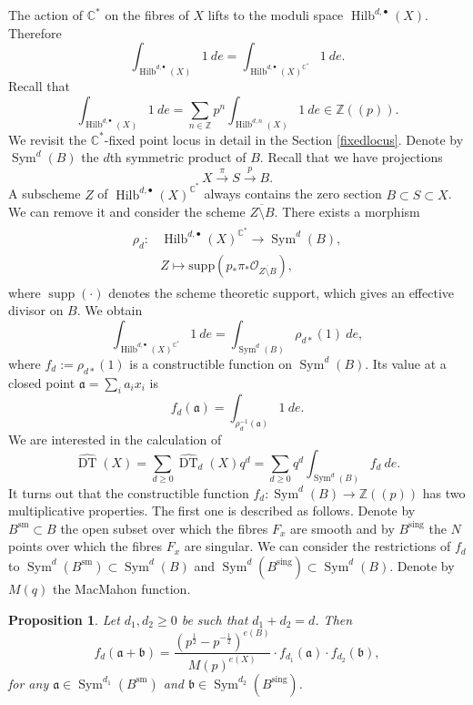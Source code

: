 \documentclass{amsart}
\newtheorem{proposition}[theorem]{Proposition}
\theoremstyle{definition}
\newcommand{\CC} {\mathbb{C}}          %
\newcommand{\ZZ} {\mathbb{Z}}		%
\renewcommand{\O}{\mathcal{O}}
\newcommand{\Sym}{\operatorname{Sym}}
\newcommand{\Hilb}{\operatorname{Hilb}}
\newcommand{\DT}{\operatorname{DT}}
\newcommand{\supp}{\operatorname{supp}}
\newcommand{\sm}{\operatorname{sm}}
\newcommand{\sing}{\operatorname{sing}}
\begin{document}
The action of $\CC^*$ on the fibres of $X$ lifts to the moduli space $\Hilb^{d,\bullet}(X)$. Therefore
$$
\int_{\Hilb^{d,\bullet}(X)} 1 \ de = \int_{\Hilb^{d,\bullet}(X)^{\CC^*}} 1 \ de.
$$
Recall that 
$$
\int_{\Hilb^{d,\bullet}(X)} 1 \ de = \sum_{n \in \ZZ} p^n \int_{\Hilb^{d,n}(X)} 1 \ de \in \ZZ(\!(p)\!).
$$
We revisit the $\CC^*$-fixed point locus in detail in the Section \ref{fixedlocus}. Denote by $\Sym^d(B)$ the $d$th symmetric product of $B$. Recall that we have projections 
$$
X \stackrel{\pi}{\longrightarrow} S \stackrel{p}{\longrightarrow} B.
$$
A subscheme $Z$ of $ \Hilb^{d,\bullet}(X)^{\CC^*}$ always contains the zero section $B \subset S \subset X$. We can remove it and consider the scheme $\overline{Z \setminus B}$. There exists a morphism
\begin{align}
\begin{split} \label{rho}
\rho_{d} : &\Hilb^{d,\bullet}(X)^{\CC^*} \longrightarrow \Sym^d(B), \\
&Z \mapsto \mathrm{supp}( p_* \pi_* \O_{\overline{Z \setminus B}} ),
\end{split}
\end{align}
where $\supp(\cdot)$ denotes the scheme theoretic support, which gives an effective divisor on $B$. 
We obtain
$$
\int_{\Hilb^{d,\bullet}(X)^{\CC^*}} 1 \ de = \int_{\Sym^d(B)} \rho_{d*}(1) \ de,
$$
where $f_d := \rho_{d*}(1)$ is a constructible function on $\Sym^d(B)$. Its value at a closed point $\mathfrak{a} = \sum_i a_i x_i$ is 
$$
f_d(\mathfrak{a}) = \int_{\rho_{d}^{-1}(\mathfrak{a})} 1 \ de.
$$
We are interested in the calculation of
$$
\widehat{\DT}(X) = \sum_{d \geq 0} \widehat{\DT}_d(X) q^d =\sum_{d \geq 0} q^d \int_{\Sym^d(B)} f_d \ de.
$$
It turns out that the constructible function $f_d : \Sym^d(B) \rightarrow \ZZ(\!(p)\!)$ has two multiplicative properties. The first one is described as follows. Denote by $B^{\sm} \subset B$ the open subset over which the fibres $F_x$ are smooth and by $B^{\sing}$ the $N$ points over which the fibres $F_x$ are singular. We can consider the restrictions of $f_d$ to $\Sym^d(B^{\sm}) \subset \Sym^d(B)$ and $\Sym^d(B^{\sing}) \subset \Sym^d(B)$. Denote by $M(q)$ the MacMahon function.
\begin{proposition} \label{mult1}
Let $d_1, d_2 \geq 0$ be such that $d_1+d_2 = d$. Then 
$$ 
f_d(\mathfrak{a} + \mathfrak{b}) =\frac{(p^{\frac{1}{2}} - p^{-\frac{1}{2}})^{e(B)}}{M(p)^{e(X)}} \cdot f_{d_1}(\mathfrak{a}) \cdot f_{d_2}(\mathfrak{b}), 
$$
for any $\mathfrak{a} \in \Sym^{d_1}(B^{\sm})$ and $\mathfrak{b} \in \Sym^{d_2}(B^{\sing})$. 
\end{proposition}
\end{document}
